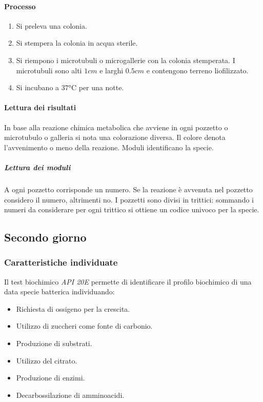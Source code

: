 			\paragraph{Processo}
			\begin{multicols}{2}
				\begin{enumerate}
					\item Si preleva una colonia.
					\item Si stempera la colonia in acqua sterile.
					\item Si riempono i microtubuli o microgallerie con la colonia stemperata.
						I microtubuli sono alti $1\si{cm}$ e larghi $0.5\si{cm}$ e contengono terreno liofilizzato.
					\item Si incubano a $37\si{\celsius}$ per una notte.
				\end{enumerate}
			\end{multicols}

			\paragraph{Lettura dei risultati}
			In base alla reazione chimica metabolica che avviene in ogni pozzetto o microtubulo o galleria si nota una colorazione diversa.
			Il colore denota l'avvenimento o meno della reazione.
			Moduli identificano la specie.

				\subparagraph{Lettura dei moduli}
				A ogni pozzetto corrisponde un numero.
				Se la reazione \`e avvenuta nel pozzetto considero il numero, altrimenti no.
				I pozzetti sono divisi in trittici: sommando i numeri da considerare per ogni trittico si ottiene un codice univoco per la specie.
	\subsection{Secondo giorno}
	
		\subsubsection{Caratteristiche individuate}
		Il test biochimico \emph{API 20E} permette di identificare il profilo biochimico di una data specie batterica individuando:
		\begin{multicols}{3}
			\begin{itemize}
				\item Richiesta di ossigeno per la crescita.
				\item Utilizzo di zuccheri come fonte di carbonio.
				\item Produzione di substrati.
				\item Utilizzo del citrato.
				\item Produzione di enzimi.
				\item Decarbossilazione di amminoacidi.
			\end{itemize}
		\end{multicols}

